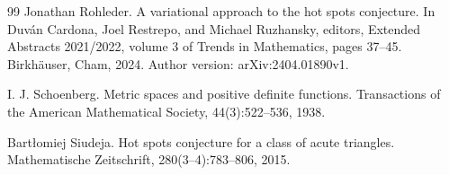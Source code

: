 \begin{thebibliography}{99}
Jonathan Rohleder. A variational approach to the hot spots conjecture. In Duv\'an Cardona, Joel Restrepo, and Michael Ruzhansky, editors, Extended Abstracts 2021/2022, volume 3 of Trends in Mathematics, pages 37--45. Birkhäuser, Cham, 2024. Author version: arXiv:2404.01890v1.

I. J. Schoenberg. Metric spaces and positive definite functions. Transactions of the American Mathematical Society, 44(3):522--536, 1938.

Bart\l{}omiej Siudeja. Hot spots conjecture for a class of acute triangles. Mathematische Zeitschrift, 280(3--4):783--806, 2015.

\end{thebibliography}
\endgroup
